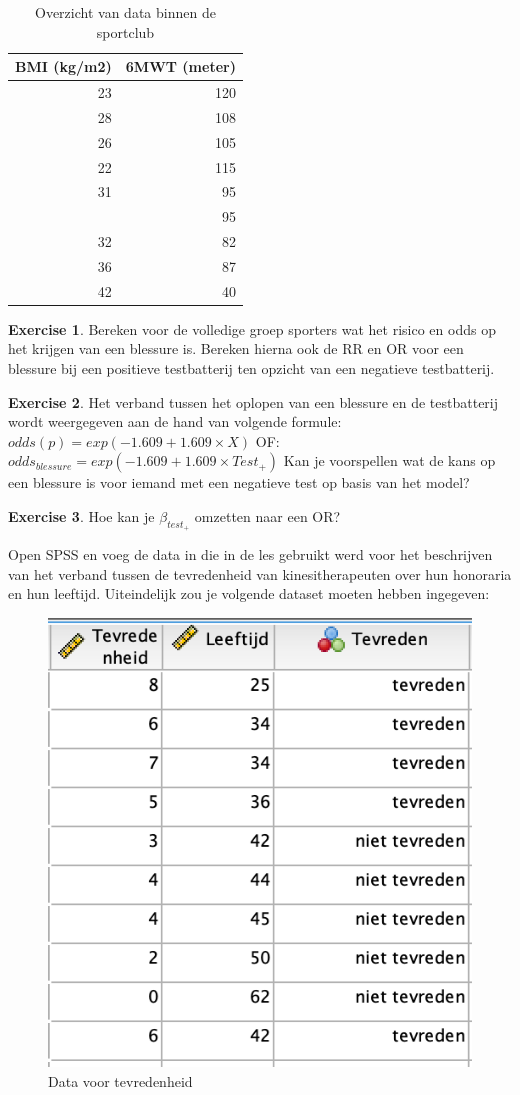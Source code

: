\documentclass[
]{book}
\theoremstyle{definition}
\theoremstyle{definition}
\theoremstyle{definition}
\newtheorem{exercise}{Exercise}[chapter]
\theoremstyle{definition}
\theoremstyle{remark}
\begin{document}
\begin{table}

\caption{\label{tab:unnamed-chunk-23}Overzicht van data binnen de sportclub}
\centering
\begin{tabular}[t]{rr}
\toprule
BMI (kg/m2) & 6MWT (meter)\\
\midrule
23 & 120\\
28 & 108\\
26 & 105\\
22 & 115\\
31 & 95\\
\addlinespace
26 & 95\\
32 & 82\\
36 & 87\\
42 & 40\\
\bottomrule
\end{tabular}
\end{table}

\begin{exercise}
Bereken voor de volledige groep sporters wat het risico en odds op het krijgen van een blessure is. Bereken hierna ook de RR en OR voor een blessure bij een positieve testbatterij ten opzicht van een negatieve testbatterij.
\end{exercise}

\begin{exercise}
Het verband tussen het oplopen van een blessure en de testbatterij wordt weergegeven aan de hand van volgende formule: \(odds(p) = exp(-1.609 + 1.609 \times X)\) OF: \(odds_{blessure} = exp(-1.609 + 1.609 \times Test_+)\) Kan je voorspellen wat de kans op een blessure is voor iemand met een negatieve test op basis van het model?
\end{exercise}

\begin{exercise}
Hoe kan je \(\beta_{test_+}\) omzetten naar een OR?
\end{exercise}

Open SPSS en voeg de data in die in de les gebruikt werd voor het beschrijven van het verband tussen de tevredenheid van kinesitherapeuten over hun honoraria en hun leeftijd. Uiteindelijk zou je volgende dataset moeten hebben ingegeven:

\begin{figure}
\includegraphics[width=0.5\linewidth]{img/ex_spss_log_1} \caption{Data voor tevredenheid}\label{fig:exspsslog1}
\end{figure}
\end{document}
